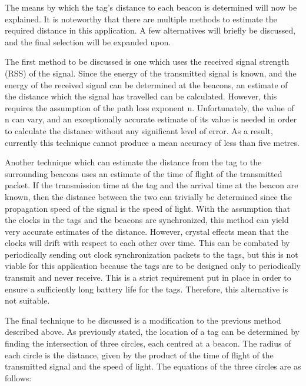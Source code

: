 \newpage
The means by which the tag's distance to each beacon is determined will now be explained. It is noteworthy that there are multiple methods to estimate the required distance in this application. A few alternatives will briefly be discussed, and the final selection will be expanded upon.

The first method to be discussed is one which uses the received signal strength (RSS) of the signal. Since the energy of the transmitted signal is known, and the energy of the received signal can be determined at the beacons, an estimate of the distance which the signal has travelled can be calculated. However, this requires the assumption of the path loss exponent n. Unfortunately, the value of n can vary, and an exceptionally accurate estimate of its value is needed in order to calculate the distance without any significant level of error. As a result, currently this technique cannot produce a mean accuracy of less than five metres.\cite{gaffney}

Another technique which can estimate the distance from the tag to the surrounding beacons uses an estimate of the time of flight of the transmitted packet. If the transmission time at the tag and the arrival time at the beacon are known, then the distance between the two can trivially be determined since the propagation speed of the signal is the speed of light. With the assumption that the clocks in the tags and the beacons are synchronized, this method can yield very accurate estimates of the distance. However, crystal effects mean that the clocks will drift with respect to each other over time.\cite{gaffney} This can be combated by periodically sending out clock synchronization packets to the tags, but this is not viable for this application because the tags are to be designed only to periodically transmit and never receive. This is a strict requirement put in place in order to ensure a sufficiently long battery life for the tags. Therefore, this alternative is not suitable.

The final technique to be discussed is a modification to the previous method described above. As previously stated, the location of a tag can be determined by finding the intersection of three circles, each centred at a beacon. The radius of each circle is the distance, given by the product of the time of flight of the transmitted signal and the speed of light. The equations of the three circles are as follows\cite{gaffney}:


